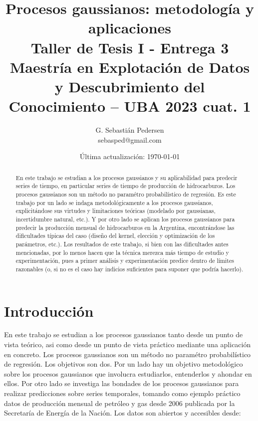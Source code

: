 \documentclass[a4paper]{article}
\title{Procesos gaussianos: metodología y aplicaciones\\ Taller de Tesis I - Entrega 3\\ Maestría en Explotación de Datos y Descubrimiento del Conocimiento -- UBA 2023 cuat. 1}%
\author{G. Sebastián Pedersen \\ {\small sebasped@gmail.com}}
\date{Última actualización: \today}
\begin{document}

	
\maketitle


	\begin{abstract}
		En este trabajo se estudian a los procesos gaussianos y su aplicabilidad para predecir series de tiempo, en particular series de tiempo de producción de hidrocarburos. Los procesos gaussianos son un método no paramétro probabilístico de regresión. Es este trabajo por un lado se indaga metodológicamente a los procesos gaussianos, explicitándose sus virtudes y limitaciones teóricas (modelado por gaussianas, incertidumbre natural, etc.). Y por otro lado se aplican los procesos gaussianos para predecir la producción mensual de hidrocarburos en la Argentina, encontrándose las dificultades típicas del caso (diseño del kernel, elección y optimización de los parámetros, etc.). Los resultados de este trabajo, si bien con las dificultades antes mencionadas, por lo menos hacen que la técnica merezca más tiempo de estudio y experimentación, pues a primer análisis y experimentación predice dentro de límites razonables (o, si no es el caso hay indicios suficientes para suponer que podría hacerlo).
	\end{abstract}

\newpage
\tableofcontents


\newpage
\section{Introducción}
\label{sec:introd}

En este trabajo se estudian a los procesos gaussianos tanto desde un punto de vista teórico, asi como desde un punto de vista práctico mediante una aplicación en concreto. Los procesos gaussianos son un método no paramétro probabilístico de regresión. Los objetivos son dos. Por un lado hay un objetivo metodológico sobre los procesos gaussianos que involucra estudiarlos, entenderlos y ahondar en ellos. Por otro lado se investiga las bondades de los procesos gaussianos para realizar predicciones sobre series temporales, tomando como ejemplo práctico datos de producción mensual de petróleo y gas desde 2006 publicada por la Secretaría de Energía de la Nación. Los datos son abiertos y accesibles desde:\\
\end{document}
